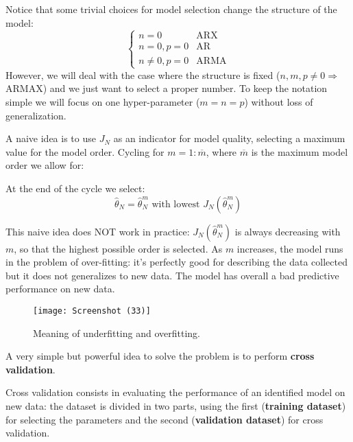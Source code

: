 Notice that some trivial choices for model selection change the structure of the model:
\begin{equation*}
\begin{cases}
n=0 & \text{ARX}\\
n=0,p=0 & \text{AR}\\
n\neq 0,p=0 & \text{ARMA}
\end{cases}
\end{equation*}
However, we will deal with the case where the structure is fixed ($ n,m,p\neq 0\Longrightarrow$ ARMAX) and we just want to select a proper number. To keep the notation simple we will focus on one hyper-parameter ($ m=n=p$) without loss of generalization.

A naive idea is to use $ J_{N}$ as an indicator for model quality, selecting a maximum value for the model order. Cycling for $ m=1:\overline{m}$, where $\overline{m}$ is the maximum model order we allow for:


At the end of the cycle we select:
\begin{equation*}
\hat{\theta }_{N} =\hat{\theta }_{N}^{m} \text{ with lowest } J_{N}(\hat{\theta }_{N}^{m})
\end{equation*}
\begin{obs}
	This naive idea does NOT work in practice: $ J_{N}(\hat{\theta }_{N}^{m})$ is always decreasing with $ m$, so that the highest possible order is selected. As $m$ increases, the model runs in the problem of over-fitting: it's perfectly good for describing the data collected but it does not generalizes to new data. The model has overall a bad predictive performance on new data.
\end{obs}
\begin{figure}[htpb]
    \centering
    \texttt{[image: Screenshot (33)]}
    \caption{Meaning of underfitting and overfitting.}
\end{figure}
\FloatBarrier
A very simple but powerful idea to solve the problem is to perform \textbf{cross validation}.

Cross validation consists in evaluating the performance of an identified model on new data: the dataset is divided in two parts, using the first (\textbf{training dataset}) for selecting the parameters and the second (\textbf{validation dataset}) for cross validation.

